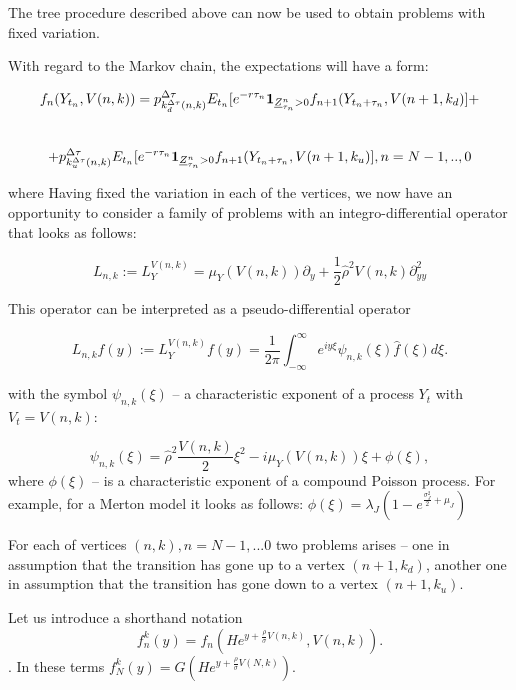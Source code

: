 \documentclass[a4paper]{jpconf}
\begin{document}
The tree procedure described above can now be used to obtain problems with fixed variation.

With regard to the Markov chain, the expectations will have a form:

$$f_{n}({Y}_{t_n}, {V}(n,k)) = p^{\Delta \tau}_{k^{\Delta \tau}_{d}(n,k)} E_{t_{n}} [ e^{-r \tau_n}  
{\bf 1}_{\underline{Z}^n_{\tau_n} > 0} f_{n+1}(Y_{t_n+\tau_n},V(n+1, k_d)] +$$ \smallskip\\
$$+ p^{\Delta \tau}_{k^{\Delta \tau}_{u}(n,k)} E_{t_{n}} [ e^{-r \tau_n}  
{\bf 1}_{\underline{Z}^n_{\tau_n} > 0} f_{n+1}(Y_{t_n+\tau_n},V(n+1, k_u)], \smallskip\\ n = N-1,..,0$$ 


where
Having fixed the variation in each of the vertices, we now have an opportunity to consider a family of problems with an integro-differential operator that looks as follows:

$$L_{n,k} := L_{Y}^{V(n,k)} = \mu_{Y}(V(n,k)) \partial_{y} + \frac{1}{2}\hat{\rho}^2 V(n,k)\partial^2_{yy}$$

This operator can be interpreted as a pseudo-differential operator 

$$L_{n,k}f(y) := L_{Y}^{V(n,k)}f(y) = \frac{1}{2\pi}\int^\infty_{-\infty}e^{iy\xi}\psi_{n,k}(\xi)\hat{f}(\xi)d\xi.$$

with the symbol $\psi_{n,k}(\xi)$ -- a characteristic exponent of a process $Y_t$ with $V_t = V(n,k)$:

\begin{equation*}
\psi_{n,k}(\xi) = \hat{\rho}^2\frac{V(n,k)}{2}\xi^2 - i\mu_Y(V(n,k))\xi + \phi(\xi),
\end{equation*}
where $\phi(\xi)$ -- is a characteristic exponent of a compound Poisson process. For example, for a Merton model it looks as follows: $\phi(\xi) = \lambda_J(1-e^{\frac{\sigma_J^2}{2} + \mu_J})$

For each of vertices $(n,k), n=N-1,...0$ two problems arises -- one in assumption that the transition has gone up to a vertex $(n+1,k_d)$, another one in assumption that the transition has gone down to a vertex $(n+1,k_u)$. 

Let us introduce a shorthand notation 
$$f_{n}^{k}(y) = f_n(He^{y+\frac{\rho}{\sigma}V(n,k)},V(n,k)).$$.
In these terms $f_{N}^{k}(y) = G(He^{y+\frac{\rho}{\sigma}V(N,k)})$.
\end{document}
